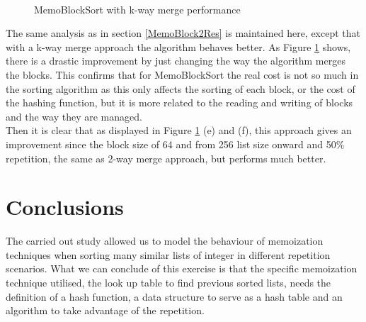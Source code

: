 \documentclass[a4paper,12pt]{article}
\begin{document}
\begin{figure}[H]
\\ %
%
\hfill %
%
\caption{MemoBlockSort with k-way merge performance}
\label{fig:MemoBlockSortKWayGraph}
\end{figure}

The same analysis as in section \ref{MemoBlock2Res} is maintained here, except that with a k-way merge approach the algorithm behaves better. As Figure \ref{fig:MemoBlockSortKWayGraph} shows, there is a drastic improvement by just changing the way the algorithm merges the blocks. 
This confirms that for MemoBlockSort the real cost is not so much in the sorting algorithm as this only affects the sorting of each block, or the cost of the hashing function, but it  is more related to the reading and writing of blocks and the way they are managed.\\

Then it is clear that as displayed in Figure \ref{fig:MemoBlockSortKWayGraph} (e) and (f), this approach gives an improvement since the block size of 64 and from 256 list size onward and 50\% repetition, the same as 2-way merge approach, but performs much better.

\section{Conclusions}
The carried out study allowed us to model the behaviour of memoization techniques when sorting many similar lists of integer in different repetition scenarios. What we can conclude of this exercise is that the specific memoization technique utilised, the look  up table to find previous sorted lists, needs the definition of a hash function, a data structure to serve as a hash table and an algorithm to take advantage of the repetition.\\
\end{document}

